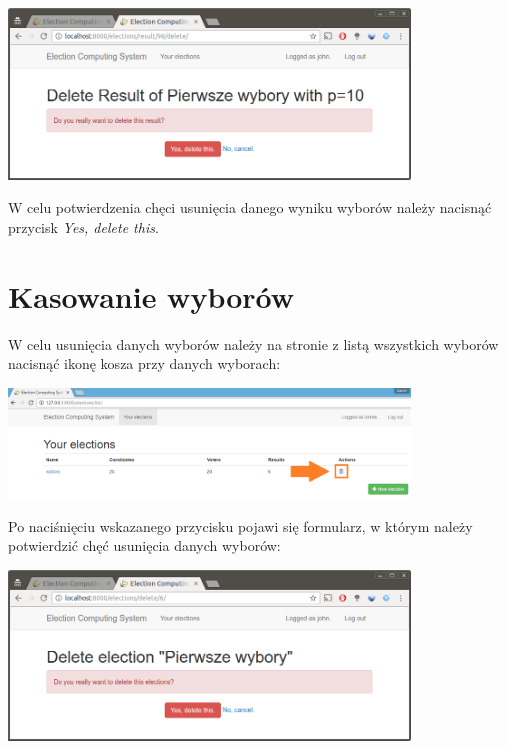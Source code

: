 \documentclass[pdflatex,11pt]{../aghdoc_version2}
\begin{document}
\begin{center}
\includegraphics[width=0.8\textwidth]{pics/delete-result.png}
\end{center}

\vspace{\baselineskip}
W celu potwierdzenia chęci usunięcia danego wyniku wyborów należy nacisnąć przycisk \textit{Yes, delete this}.

\section{Kasowanie wyborów}
\label{sec:kasowaniewyborow}

W celu usunięcia danych wyborów należy na stronie z listą wszystkich wyborów nacisnąć ikonę kosza przy danych wyborach: \\

\begin{center}
\includegraphics[width=0.8\textwidth]{pics/delete_election_button.png}
\end{center}

\newpage
Po naciśnięciu wskazanego przycisku pojawi się formularz, w którym należy potwierdzić chęć usunięcia danych wyborów: \\

\begin{center}
\includegraphics[width=0.8\textwidth]{pics/delete-elections.png}
\end{center}
\end{document}

